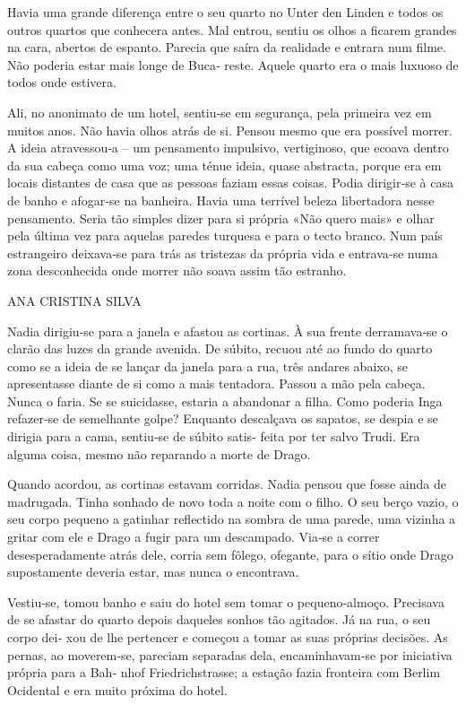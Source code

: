 Havia uma grande diferença entre o seu quarto no Unter den Linden e
todos os outros quartos que conhecera antes. Mal entrou, sentiu os olhos
a ficarem grandes na cara, abertos de espanto. Parecia que saíra da
realidade e entrara num filme. Não poderia estar mais longe de Buca‑
reste. Aquele quarto era o mais luxuoso de todos onde estivera.

Ali, no anonimato de um hotel, sentiu‑se em segurança, pela primeira vez
em muitos anos. Não havia olhos atrás de si. Pensou mesmo que era
possível morrer. A ideia atravessou‑a -- um pensamento impulsivo,
vertiginoso, que ecoava dentro da sua cabeça como uma voz; uma ténue
ideia, quase abstracta, porque era em locais distantes de casa que as
pessoas faziam essas coisas. Podia dirigir‑se à casa de banho e
afogar‑se na banheira. Havia uma terrível beleza libertadora nesse
pensamento. Seria tão simples dizer para si própria «Não quero mais» e
olhar pela última vez para aquelas paredes turquesa e para o tecto
branco. Num país estrangeiro deixava‑se para trás as tristezas da
própria vida e entrava‑se numa zona desconhecida onde morrer não soava
assim tão estranho.

ANA CRISTINA SILVA

Nadia dirigiu‑se para a janela e afastou as cortinas. À sua frente
derramava‑se o clarão das luzes da grande avenida. De súbito, recuou até
ao fundo do quarto como se a ideia de se lançar da janela para a rua,
três andares abaixo, se apresentasse diante de si como a mais tentadora.
Passou a mão pela cabeça. Nunca o faria. Se se suicidasse, estaria a
abandonar a filha. Como poderia Inga refazer‑se de semelhante golpe?
Enquanto descalçava os sapatos, se despia e se dirigia para a cama,
sentiu‑se de súbito satis‑ feita por ter salvo Trudi. Era alguma coisa,
mesmo não reparando a morte de Drago.

Quando acordou, as cortinas estavam corridas. Nadia pensou que fosse
ainda de madrugada. Tinha sonhado de novo toda a noite com o filho. O
seu berço vazio, o seu corpo pequeno a gatinhar reflectido na sombra de
uma parede, uma vizinha a gritar com ele e Drago a fugir para um
descampado. Via‑se a correr desesperadamente atrás dele, corria sem
fôlego, ofegante, para o sítio onde Drago supostamente deveria estar,
mas nunca o encontrava.

Vestiu‑se, tomou banho e saiu do hotel sem tomar o pequeno‑almoço.
Precisava de se afastar do quarto depois daqueles sonhos tão agitados.
Já na rua, o seu corpo dei‑ xou de lhe pertencer e começou a tomar as
suas próprias decisões. As pernas, ao moverem‑se, pareciam separadas
dela, encaminhavam‑se por iniciativa própria para a Bah‑ nhof
Friedrichstrasse; a estação fazia fronteira com Berlim Ocidental e era
muito próxima do hotel.

